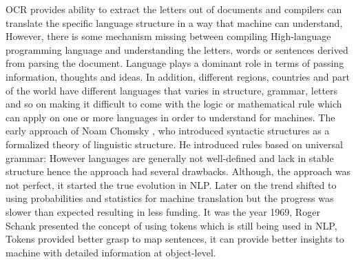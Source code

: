 OCR provides ability to extract the letters out of documents and compilers can translate the specific language structure in a way that machine can understand, However, there is some mechanism missing between compiling High-language programming language and understanding the letters, words or sentences derived from parsing the document. Language plays a dominant role in terms of passing information, thoughts and ideas. In addition, different regions, countries and part of the world have different languages that varies in structure, grammar, letters and so on making it difficult to come with the logic or mathematical rule which can apply on one or more languages in order to understand for machines. The early approach of Noam Chomsky \cite{robert1957review}, who introduced syntactic structures as a formalized theory of linguistic structure. He introduced rules based on universal grammar: However languages are generally not well-defined and lack in stable structure hence the approach had several drawbacks. Although, the approach was not perfect, it started the true evolution in NLP. Later on the trend shifted to using probabilities and statistics for machine translation but the progress was slower than expected resulting in less funding. It was the year 1969, Roger Schank presented the concept of using tokens \cite{tokenization_history} which is still being used in NLP, Tokens provided better grasp to map sentences, it can provide better insights to machine with detailed information at object-level. 







